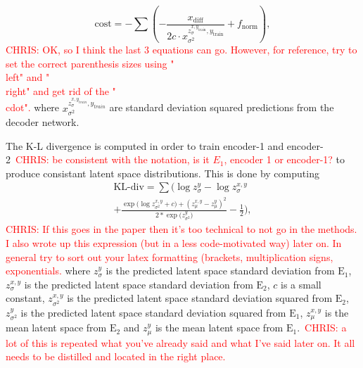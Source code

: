 \documentclass[%
showpacs,
 amsmath,amssymb,
 aps,
 twocolumn,
 prl,
 reprint,
floatfix,
]{revtex4-1}
\newcommand{\chris}[1]{\textcolor{red}{CHRIS: #1}}
\begin{document}
%
\begin{equation}
    \textrm{cost} = - \sum (-\frac{x_{\textrm{diff}}}{2c \cdot 
    x^{z^{x,y_{\textrm{train}}}_{\sigma},y_{\textrm{train}}}_{\sigma^{2}}} + f_{\textrm{norm}}),\label{eq:cost}
\end{equation}
%
\chris{OK, so I think the last 3 equations can go. However, for reference, try
to set the correct parenthesis sizes using "\\left" and "\\right" and get rid of
the "\\cdot".} where $x^{z^{x,y_{train}}_{\sigma},y_{train}}_{\sigma^{2}}$ are
standard deviation squared predictions from the decoder network.

%
%
The K-L divergence is computed in order to train encoder-1 and
encoder-2~\chris{be consistent with the notation, is it $E_{1}$, encoder 1 or
encoder-1?} to produce consistant latent space distributions. This is done by
computing 
%
\begin{equation}
    \begin{split}
    \textrm{KL-div} = \sum(\log{z^{y}_{\sigma}}-\log{z^{x,y}_{\sigma}} \\
    +\frac{\exp{(\log{z^{x,y}_{\sigma^{2}}+c)}}+(z^{x,y}_{\mu}-z^{y}_{\mu})^{2}}{2*\exp{(z^{y}_{\sigma^{2}}})}
    -\frac{1}{2}),\label{eq:kl}
    \end{split}
\end{equation}
%
\chris{If this goes in the paper then it's too technical to not go in the
methods. I also wrote up this expression (but in a less code-motivated way)
later on. In general try to sort out your latex formatting (brackets,
multiplication signs, exponentials.} where $z^{y}_{\sigma}$ is the predicted
latent space standard deviation from $\textrm{E}_1$, $z^{x,y}_{\sigma}$ is the
predicted latent space standard deviation from $\textrm{E}_2$, $c$ is a small
constant, $z^{x,y}_{\sigma^{2}}$ is the predicted latent space standard
deviation squared from $\textrm{E}_2$, $z^{y}_{\sigma^{2}}$ is the predicted
latent space standard deviation squared from $\textrm{E}_1$, $z^{x,y}_{\mu}$ is
the mean latent space from $\textrm{E}_2$ and $z^{y}_{\mu}$ is the mean latent
space from $\textrm{E}_1$.~\chris{a lot of this is repeated what you've already
said and what I've said later on. It all needs to be distilled and located in
the right place.}
\end{document}
